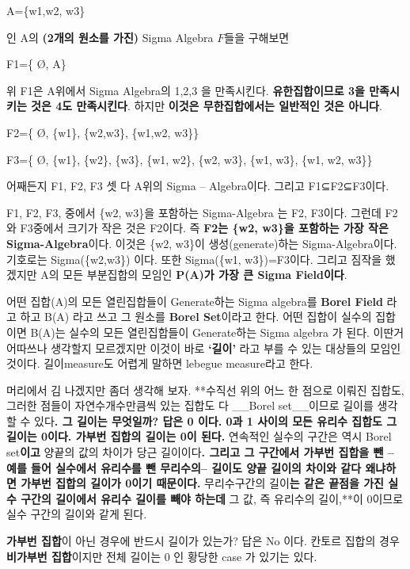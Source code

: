 \documentclass[
]{book}
\begin{document}
{{{A=\{w1,w2, w3\}

인 A의 \textbf{(2개의 원소를 가진)} Sigma Algebra \(F\)들을 구해보면

F1=\{ Ø, A\}

위 F1은 A위에서 Sigma Algebra의 1,2,3 을 만족시킨다. \textbf{유한집합이므로 3을 만족시키는 것은 4도 만족시킨다}. 하지만 \textbf{이것은 무한집합에서는 일반적인 것은 아니다}.

F2=\{ Ø, \{w1\}, \{w2,w3\}, \{w1,w2, w3\}\}

F3=\{ Ø, \{w1\}, \{w2\}, \{w3\}, \{w1, w2\}, \{w2, w3\}, \{w1, w3\}, \{w1, w2, w3\}\}

어째든지 F1, F2, F3 셋 다 A위의 Sigma -- Algebra이다. 그리고 F1⊆F2⊆F3이다.

F1, F2, F3, 중에서 \{w2, w3\}을 포함하는 Sigma-Algebra 는 F2, F3이다. 그런데 F2와 F3중에서 크기가 작은 것은 F2이다. 즉 \textbf{F2는 \{w2, w3\}을 포함하는 가장 작은 Sigma-Algebra}이다. 이것은 \{w2, w3\}이 생성(generate)하는 Sigma-Algebra이다. 기호로는 Sigma(\{w2,w3\}) 이다. 또한 Sigma(\{w1, w3\})=F3이다. 그리고 짐작을 했겠지만 A의 모든 부분집합의 모임인 \textbf{P(A)가 가장 큰 Sigma Field이다}.

어떤 집합(A)의 모든 열린집합들이 Generate하는 Sigma algebra를 \textbf{Borel Field} 라고 하고 B(A) 라고 쓰고 그 원소를 \textbf{Borel Set}이라고 한다. 어떤 집합이 실수의 집합이면 B(A)는 실수의 모든 열린집합들이 Generate하는 Sigma algebra 가 된다. 이딴거 어따쓰나 생각할지 모르겠지만 이것이 바로 \textbf{`길이'} 라고 부를 수 있는 대상들의 모임인 것이다. 길이measure도 어렵게 말하면 lebegue measure라고 한다.

머리에서 김 나겠지만 좀더 생각해 보자. **수직선 위의 어느 한 점으로 이뤄진 집합도, 그러한 점들이 자연수개수만큼씩 있는 집합도 다 \_\_Borel set\_\_이므로 길이를 생각할 수 있다\textbf{. 그 길이는 무엇일까? 답은 0 이다. 0과 1 사이의 모든 유리수 집합도 그 길이는 0이다. 가부번 집합의 길이는 0이 된다. }연속적인 실수의 구간은 역시 Borel set\textbf{이고 }양끝의 값의 차이가 당근 길이이다\textbf{. 그리고 그 구간에서 가부번 집합을 뺀 -- 예를 들어 실수에서 유리수를 뺀 무리수의-- 길이도 양끝 길이의 차이와 같다 왜냐하면 가부번 집합의 길이가 0이기 때문이다. }무리수구간의 길이\textbf{는 같은 끝점을 가진 실수 구간의 길이에서 유리수 길이를 빼야 하는데 }그 값, 즉 유리수의 길이,**이 0이므로 실수 구간의 길이와 같게 된다.

\textbf{가부번 집합}이 아닌 경우에 반드시 길이가 있는가? 답은 No 이다. 칸토르 집합의 경우 \textbf{비가부번 집합}이지만 전체 길이는 0 인 황당한 case 가 있기는 있다.

}}}
\end{document}
